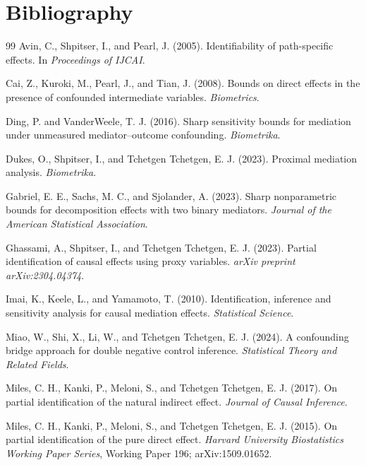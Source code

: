 \documentclass[11pt]{article}
\theoremstyle{definition}
\theoremstyle{plain}
\theoremstyle{remark}
\begin{document}
\section*{Bibliography}
\begin{thebibliography}{99}
Avin, C., Shpitser, I., and Pearl, J. (2005).
Identifiability of path-specific effects.
In \emph{Proceedings of IJCAI}.

Cai, Z., Kuroki, M., Pearl, J., and Tian, J. (2008).
Bounds on direct effects in the presence of confounded intermediate variables.
\emph{Biometrics}.

Ding, P. and VanderWeele, T. J. (2016).
Sharp sensitivity bounds for mediation under unmeasured mediator--outcome confounding.
\emph{Biometrika}.

Dukes, O., Shpitser, I., and Tchetgen Tchetgen, E. J. (2023).
Proximal mediation analysis.
\emph{Biometrika}.

Gabriel, E. E., Sachs, M. C., and Sjolander, A. (2023).
Sharp nonparametric bounds for decomposition effects with two binary mediators.
\emph{Journal of the American Statistical Association}.

Ghassami, A., Shpitser, I., and Tchetgen Tchetgen, E. J. (2023).
Partial identification of causal effects using proxy variables.
\emph{arXiv preprint arXiv:2304.04374}.

Imai, K., Keele, L., and Yamamoto, T. (2010).
Identification, inference and sensitivity analysis for causal mediation effects.
\emph{Statistical Science}.

Miao, W., Shi, X., Li, W., and Tchetgen Tchetgen, E. J. (2024).
A confounding bridge approach for double negative control inference.
\emph{Statistical Theory and Related Fields}.

Miles, C. H., Kanki, P., Meloni, S., and Tchetgen Tchetgen, E. J. (2017).
On partial identification of the natural indirect effect.
\emph{Journal of Causal Inference}.

Miles, C. H., Kanki, P., Meloni, S., and Tchetgen Tchetgen, E. J. (2015).
On partial identification of the pure direct effect.
\emph{Harvard University Biostatistics Working Paper Series}, Working Paper
196; arXiv:1509.01652.


\end{thebibliography}
\end{document}
